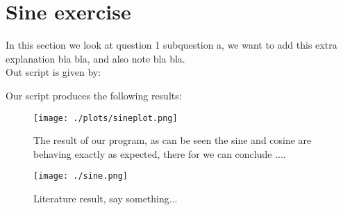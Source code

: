 \section{Sine exercise}

In this section we look at question 1 subquestion a, 
we want to add this extra explanation bla bla, and also 
note bla bla. \\

Out script is given by:


Our script produces the following results:


\begin{figure}[h!]
  \centering
  \texttt{[image: ./plots/sineplot.png]}
  \caption{The result of our program, as can be seen the 
  sine and cosine are behaving exactly as expected, there 
  for we can conclude ....}
\end{figure}

\begin{figure}[h!]
  \centering
  \texttt{[image: ./sine.png]}
  \caption{Literature result, say something...}
\end{figure}
